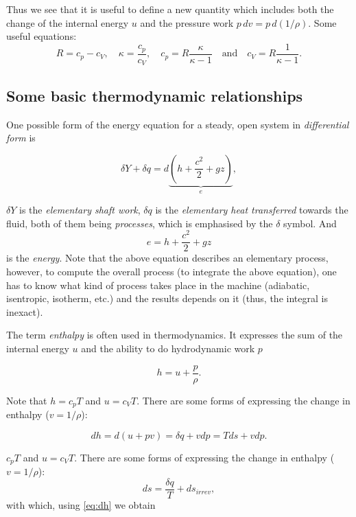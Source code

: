 Thus we see that it is useful to define a new quantity which includes both the change of the internal energy $u$ and the pressure work $p\,dv=p\, d\left( 1/\rho \right)$. Some useful equations:
%
\begin{equation}
R=c_p-c_V, \quad \kappa=\frac{c_p}{c_V}, \quad c_p=R \frac{\kappa}{\kappa-1} \quad \text{and} \quad c_V=R\frac{1}{\kappa-1}.
\end{equation}

\subsection{Some basic thermodynamic relationships}

One possible form of the energy equation for a steady, open system in \emph{differential form} is

\begin{equation}
\delta Y + \delta q = d  \underbrace{ \left(h +\frac{c^2}{2}+gz\right)}_{e},
\label{eq:first_law_of_thermodynamics}
\end{equation}

\noindent $\delta Y$ is the \emph{elementary shaft work}, $\delta q$ is the \emph{elementary heat transferred} towards the fluid, both of them being \emph{processes}, which is emphasised by the $\delta$ symbol. And $$ e = h +\frac{c^2}{2}+gz $$ is the \emph{energy}.
Note that the above equation describes an elementary process, however, to compute the overall process (to integrate the above equation), one has to know what kind of process takes place in the machine (adiabatic, isentropic, isotherm, etc.) and the results depends on it (thus, the integral is inexact).

The term \emph{enthalpy} is often used in thermodynamics. It expresses the sum of the internal energy $u$ and the ability to do hydrodynamic work $p$

\begin{equation}
h=u+\frac{p}{\rho}.
\end{equation}

\noindent Note that $h=c_p T$ and $u=c_V T$. There are some forms of expressing the change in enthalpy ($v=1/\rho$):

\begin{equation}
d h=d (u+pv) = \delta q + v dp = Tds+v dp.
\label{eq:dh}
\end{equation}

$c_p T$ and $u=c_V T$. There are some forms of expressing the change in enthalpy ($v=1/\rho$):
%
\begin{equation}
d s=\frac{\delta q}{T} + d s_{irrev},
\end{equation}
%
with which, using \eqref{eq:dh} we obtain

